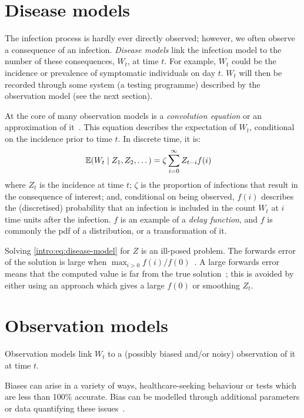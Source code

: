 \documentclass[thesis.tex]{subfiles}
\begin{document}
\section{Disease models} \label{intro:sec:disease-model}

The infection process is hardly ever directly observed; however, we often observe a consequence of an infection.
\emph{Disease models} link the infection model to the number of these consequences, $W_t$, at time $t$.
For example, $W_t$ could be the incidence or prevalence of symptomatic individuals on day $t$.
$W_t$ will then be recorded through some system (\eg a testing programme) described by the observation model (see the next section).

At the core of many observation models is a \emph{convolution equation} or an approximation of it~\autocite[e.g.][]{brookmeyerBackcalculation,abbottEstimating,birrellBayesian}.
This equation describes the expectation of $W_t$, conditional on the incidence prior to time $t$.
In discrete time, it is:
\begin{align}
    \operatorname{\mathbb{E}}(W_t \mid Z_1, Z_2, \dots) &= \zeta \sum_{i=0}^\infty Z_{t-i} f(i)
    \label{intro:eq:disease-model}
\end{align}
where $Z_t$ is the incidence at time $t$; $\zeta$ is the proportion of infections that result in the consequence of interest; and, conditional on being observed, $f(i)$ describes the (discretised) probability that an infection is included in the count $W_t$ at $i$ time units after the infection.
$f$ is an example of a \emph{delay function}, and $f$ is commonly the pdf of a distribution, or a transformation of it.

Solving \cref{intro:eq:disease-model} for $Z$ is an ill-posed problem.
The forwards error of the solution is large when $\max_{i > 0} f(i) / f(0)$~\autocite[chapter 8.2]{highamAccuracy}.
A large forwards error means that the computed value is far from the true solution~\autocite[6--9]{highamAccuracy}; this is avoided by either using an approach which gives a large $f(0)$ or smoothing $Z_t$.

\section{Observation models}

Observation models link $W_t$ to a (possibly biased and/or noisy) observation of it at time $t$.

Biases can arise in a variety of ways, \eg healthcare-seeking behaviour or tests which are less than 100\% accurate.
Bias can be modelled through additional parameters or data quantifying these issues~\autocite[e.g.][]{sherrattExploring,birrellBayesian,nicholsonImproving,swallow2022challenges}.
\end{document}
